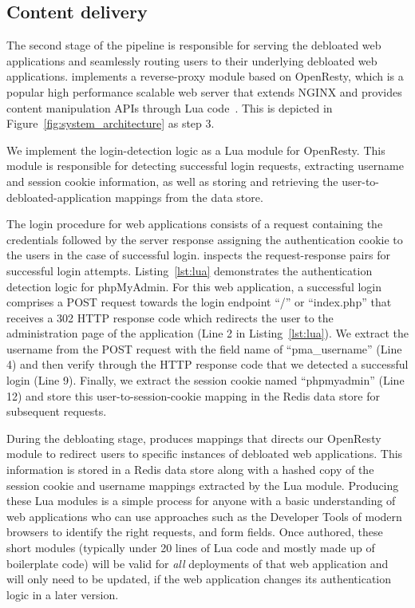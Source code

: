 \subsection{Content delivery}
\label{sec:content_delivery}

The second stage of the \dbltr{} pipeline is responsible for serving the debloated web applications and seamlessly routing users to their underlying debloated web applications. 
\dbltr{} implements a reverse-proxy module based on OpenResty, which is a popular high performance scalable web server that extends NGINX and provides content manipulation APIs through Lua code~\cite{openresty}. 
This is depicted in Figure~\ref{fig:system_architecture} as step 3. 

We implement the login-detection logic as a Lua module for OpenResty. 
This module is responsible for detecting successful login requests, extracting username and session cookie information, as well as storing and retrieving the user-to-debloated-application mappings from the data store.

The login procedure for web applications consists of a request containing the credentials followed by the server response assigning the authentication cookie to the users in the case of successful login. 
\dbltr{} inspects the request-response pairs for successful login attempts. 
Listing~\ref{lst:lua} demonstrates the authentication detection logic for phpMyAdmin. 
For this web application, a successful login comprises a POST request towards the login endpoint ``/'' or ``index.php'' that receives a 302 HTTP response code which redirects the user to the administration page of the application (Line 2 in Listing~\ref{lst:lua}). 
We extract the username from the POST request with the field name of ``pma\_username'' (Line 4) and then verify through the HTTP response code that we detected a successful login (Line 9). Finally, we extract the session cookie named ``phpmyadmin'' (Line 12) and store this user-to-session-cookie mapping in the Redis data store for subsequent requests. 

During the debloating stage, \dbltr{} produces mappings that directs our OpenResty module to redirect users to specific instances of debloated web applications. 
This information is stored in a Redis data store along with a hashed copy of the session cookie and username mappings extracted by the Lua module. Producing these Lua modules is a simple process for anyone with a basic understanding of web applications who can use approaches such as the Developer Tools of modern browsers to identify the right requests, and form fields. Once authored, these short modules (typically under 20 lines of Lua code and mostly made up of boilerplate code) will be valid for \emph{all} deployments of that web application and will only need to be updated, if the web application changes its authentication logic in a later version. 


